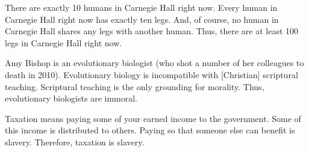 \begin{exercises}
\item There are exactly 10 humans in Carnegie Hall right now. Every human in Carnegie Hall right now has exactly ten legs. And, of course, no human in Carnegie Hall shares any legs with another human. Thus, there are at least 100 legs in Carnegie Hall right now.


\item Amy Bishop is an evolutionary biologist (who shot a number of her colleagues to death in 2010). Evolutionary biology is incompatible with [Christian] scriptural teaching. Scriptural teaching is the only grounding for morality. Thus, evolutionary biologists are immoral.


%

\item Taxation means paying some of your earned income to the government. Some of this income is distributed to others. Paying so that someone else can benefit is slavery. Therefore, taxation is slavery.



\end{exercises}
